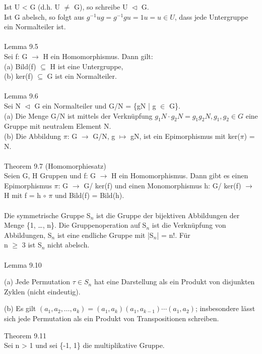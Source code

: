 \documentclass[fontsize=10pt]{scrartcl}
\begin{document}
Ist U < G (d.h. U $\neq$ G), so schreibe U $\vartriangleleft$ G.\\
Ist G abelsch, so folgt aus $g^{-1}ug = g^{-1}gu = 1u = u \in U$, dass jede Untergruppe ein Normalteiler ist.\\
\\
Lemma 9.5\\
Sei f: G $\to$ H ein Homomorphismus. Dann gilt:\\
(a) Bild(f) $\subseteq$ H ist eine Untergruppe,\\
(b) ker(f) $\subseteq$ G ist ein Normalteiler.\\
\\
Lemma 9.6\\
Sei N $\vartriangleleft$ G ein Normalteiler und G/N = \{gN | g $\in$ G\}.\\
(a) Die Menge G/N ist mittels der Verknüpfung $g_1N \cdot g_2N = g_1g_2N, g_1,g_2 \in G$ eine Gruppe mit neutralem \hspace*{5mm} Element N.\\
(b) Die Abbildung $\pi$: G $\to$ G/N, g $\mapsto$ gN, ist ein Epimorphismus mit ker($\pi$) = N.\\
\\
Theorem 9.7 (Homomorphiesatz)\\
Seien G, H Gruppen und f: G $\to$ H ein Homomorphismus. Dann gibt es einen Epimorphismus $\pi$: G $\to$ G/ ker(f) und einen Monomorphismus h: G/ ker(f) $\to$ H mit f = h $\circ$ $\pi$ und Bild(f) = Bild(h).\\
\\
Die symmetrische Gruppe S$_n$ ist die Gruppe der bijektiven Abbildungen der Menge \{1, …, n\}. Die Gruppenoperation auf S$_n$ ist die Verknüpfung von Abbildungen, S$_n$ ist eine endliche Gruppe mit |S$_n$| = n!. Für \\n $\ge$ 3 ist S$_n$ nicht abelsch.\\
\\
Lemma 9.10
\begin{compactenum}
\item[(a)] Jede Permutation $\tau \in S_n$ hat eine Darstellung als ein Produkt von disjunkten Zyklen (nicht eindeutig).
\item[(b)] Es gilt $(a_1, a_2, …, a_k) = (a_1, a_k)(a_1, a_{k-1}) \cdots (a_1, a_2)$; insbesondere lässt sich jede Permutation als ein Produkt von Transpositionen schreiben.\\
\end{compactenum}
Theorem 9.11\\
Sei n > 1 und sei \{-1, 1\} die multiplikative Gruppe.
\end{document}
